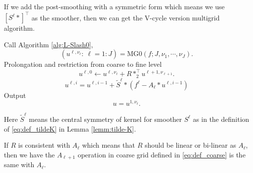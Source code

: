 If we add the post-smoothing with a symmetric form which means we 
use $[S^\ell \ast ]^\top$ as the smoother, then we can get the V-cycle
version multigrid algorithm.

\begin{breakablealgorithm}%
	\caption{$u = {\text{V-MG}}(f; J,\nu_1, \cdots, \nu_J)$}
	\label{alg:V-cycle}
	\begin{algorithmic}
		\State Call Algorithm \ref{alg:L-Slash0},
		$$
		(u^{\ell,\nu_\ell}: ~\ell = 1:J) = {\text{MG0}}(f; J,\nu_1, \cdots, \nu_J).
		$$
		\State Prolongation and restriction from coarse to fine level
		\State
		$$
		u^{\ell,0} \leftarrow u^{\ell,\nu_\ell} + R  \ast_2^{\top} u^{\ell+1, \nu_{\ell+1}}.
		$$
		\State
		$$
		u^{\ell,i} = u^{\ell,i-1} + \tilde S^\ell \ast (f^\ell - A_\ell \ast u^{\ell,i-1})
		$$
		\EndFor
		\EndFor
		\State Output
		$$
		u = u^{1,\nu_\ell}.
		$$
	\end{algorithmic}
\end{breakablealgorithm}
Here $\tilde S^\ell $ means the central symmetry of kernel for smoother $S^\ell$ as in the 
definition of \eqref{eq:def_tildeK} in Lemma \ref{lemm:tilde-K}.


\begin{theorem}
If $R$ is consistent with $A_\ell$ which means that $R$ should be linear or bi-linear as $A_\ell$, then we have
the $A_{\ell+1}$ operation in coarse grid defined in \eqref{eq:def_coarse} is the same with $A_\ell$.
\end{theorem}

